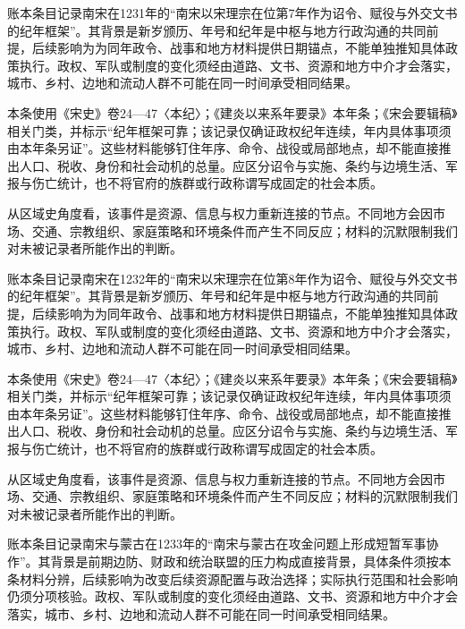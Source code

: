 账本条目记录南宋在1231年的“南宋以宋理宗在位第7年作为诏令、赋役与外交文书的纪年框架”。其背景是新岁颁历、年号和纪年是中枢与地方行政沟通的共同前提，后续影响为为同年政令、战事和地方材料提供日期锚点，不能单独推知具体政策执行。政权、军队或制度的变化须经由道路、文书、资源和地方中介才会落实，城市、乡村、边地和流动人群不可能在同一时间承受相同结果。

本条使用《宋史》卷24—47〈本纪〉；《建炎以来系年要录》本年条；《宋会要辑稿》相关门类，并标示“纪年框架可靠；该记录仅确证政权纪年连续，年内具体事项须由本年条另证”。这些材料能够钉住年序、命令、战役或局部地点，却不能直接推出人口、税收、身份和社会动机的总量。应区分诏令与实施、条约与边境生活、军报与伤亡统计，也不将官府的族群或行政称谓写成固定的社会本质。

从区域史角度看，该事件是资源、信息与权力重新连接的节点。不同地方会因市场、交通、宗教组织、家庭策略和环境条件而产生不同反应；材料的沉默限制我们对未被记录者所能作出的判断。

账本条目记录南宋在1232年的“南宋以宋理宗在位第8年作为诏令、赋役与外交文书的纪年框架”。其背景是新岁颁历、年号和纪年是中枢与地方行政沟通的共同前提，后续影响为为同年政令、战事和地方材料提供日期锚点，不能单独推知具体政策执行。政权、军队或制度的变化须经由道路、文书、资源和地方中介才会落实，城市、乡村、边地和流动人群不可能在同一时间承受相同结果。

本条使用《宋史》卷24—47〈本纪〉；《建炎以来系年要录》本年条；《宋会要辑稿》相关门类，并标示“纪年框架可靠；该记录仅确证政权纪年连续，年内具体事项须由本年条另证”。这些材料能够钉住年序、命令、战役或局部地点，却不能直接推出人口、税收、身份和社会动机的总量。应区分诏令与实施、条约与边境生活、军报与伤亡统计，也不将官府的族群或行政称谓写成固定的社会本质。

从区域史角度看，该事件是资源、信息与权力重新连接的节点。不同地方会因市场、交通、宗教组织、家庭策略和环境条件而产生不同反应；材料的沉默限制我们对未被记录者所能作出的判断。

账本条目记录南宋与蒙古在1233年的“南宋与蒙古在攻金问题上形成短暂军事协作”。其背景是前期边防、财政和统治联盟的压力构成直接背景，具体条件须按本条材料分辨，后续影响为改变后续资源配置与政治选择；实际执行范围和社会影响仍须分项核验。政权、军队或制度的变化须经由道路、文书、资源和地方中介才会落实，城市、乡村、边地和流动人群不可能在同一时间承受相同结果。

